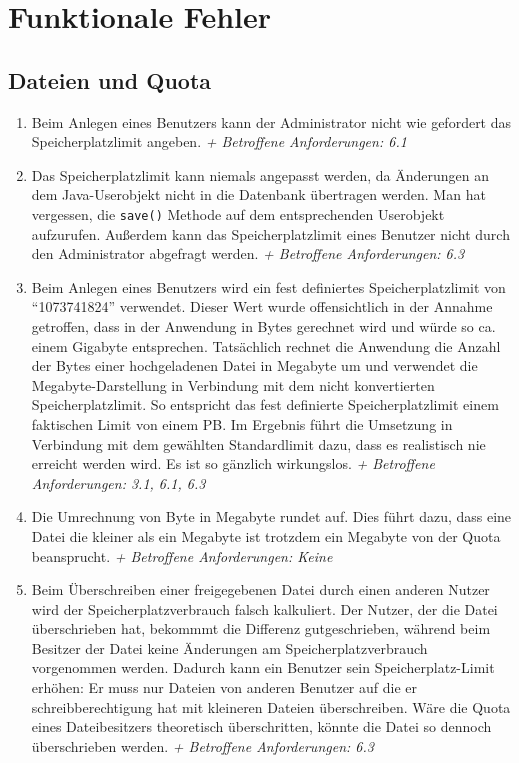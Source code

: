 \documentclass[12pt,DIV14,BCOR10mm,a4paper,parskip=half-,headsepline,headinclude,english,ngerman,bibliography=totocnumbered]{scrreprt}
\begin{document}
\chapter{Funktionale Fehler}


\section{Dateien und Quota}

\begin{enumerate}
\item Beim Anlegen eines Benutzers kann der Administrator nicht wie gefordert das Speicherplatzlimit angeben.\newline
\textit{+ Betroffene Anforderungen: 6.1}

\item Das Speicherplatzlimit kann niemals angepasst werden, da Änderungen an dem Java-Userobjekt nicht in die Datenbank übertragen werden. Man hat vergessen, die \texttt{save()} Methode auf dem entsprechenden Userobjekt aufzurufen. Außerdem kann das Speicherplatzlimit eines Benutzer nicht durch den Administrator abgefragt werden.\newline
\textit{+ Betroffene Anforderungen: 6.3}

\item Beim Anlegen eines Benutzers wird ein fest definiertes Speicherplatzlimit von \enquote{1073741824} verwendet. Dieser Wert wurde offensichtlich in der Annahme getroffen, dass in der Anwendung in Bytes gerechnet wird und würde so ca. einem Gigabyte entsprechen. Tatsächlich rechnet die Anwendung die Anzahl der Bytes einer hochgeladenen Datei in Megabyte um und verwendet die Megabyte-Darstellung in Verbindung mit dem nicht konvertierten Speicherplatzlimit. So entspricht das fest definierte Speicherplatzlimit einem faktischen Limit von einem PB. Im Ergebnis führt die Umsetzung in Verbindung mit dem gewählten Standardlimit dazu, dass es realistisch nie erreicht werden wird. Es ist so gänzlich wirkungslos.\newline
\textit{+ Betroffene Anforderungen: 3.1, 6.1, 6.3}

\item Die Umrechnung von Byte in Megabyte rundet auf. Dies führt dazu, dass eine Datei die kleiner als ein Megabyte ist trotzdem ein Megabyte von der Quota beansprucht.\newline
\textit{+ Betroffene Anforderungen: Keine}

\item Beim Überschreiben einer freigegebenen Datei durch einen anderen Nutzer wird der Speicherplatzverbrauch falsch kalkuliert. Der Nutzer, der die Datei überschrieben hat, bekommmt die Differenz gutgeschrieben, während beim Besitzer der Datei keine Änderungen am Speicherplatzverbrauch vorgenommen werden. Dadurch kann ein Benutzer sein Speicherplatz-Limit erhöhen: Er muss nur Dateien von anderen Benutzer auf die er schreibberechtigung hat mit kleineren Dateien überschreiben. Wäre die Quota eines Dateibesitzers theoretisch überschritten, könnte die Datei so dennoch überschrieben werden.\newline
\textit{+ Betroffene Anforderungen: 6.3}


\end{enumerate}
\end{document}
